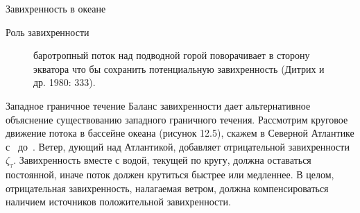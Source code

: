 \begin{chapter}{Завихренность в океане}
\begin{section}{Роль завихренности}
\begin{figure}[h!]
\begin{center}
\end{center}
\caption{баротропный поток над подводной горой поворачивает в сторону
экватора что бы сохранить потенциальную завихренность (Дитрих и
др. 1980: 333).}
\label{fig:ridgevorticity}
\vspace{-3ex}
\end{figure}
%
%

\begin{paragraph}{Западное граничное течение}
Баланс завихренности дает альтернативное объяснение существованию
западного граничного течения. Рассмотрим круговое движение потока в
бассейне океана (рисунок 12.5), скажем в Северной Атлантике
с~ до~. Ветер, дующий над Атлантикой,
добавляет отрицательной завихренности~$\zeta_{\tau}$. Завихренность
вместе с водой, текущей по кругу, должна оставаться постоянной, иначе
поток должен крутиться быстрее или медленнее. В целом, отрицательная
завихренность, налагаемая ветром, должна компенсироваться наличием
источников положительной завихренности.
%


\end{paragraph}
\end{section}
\end{chapter}
